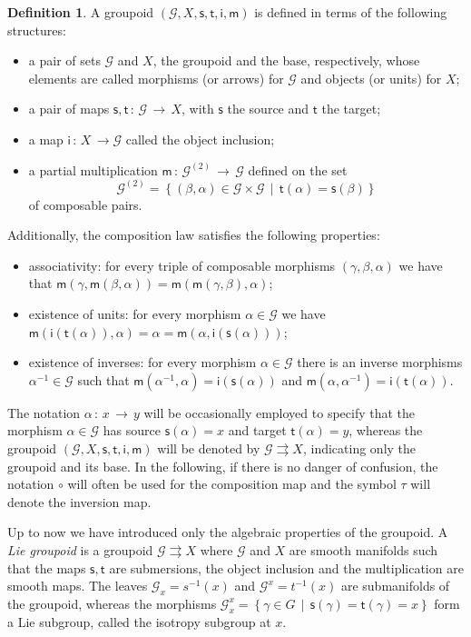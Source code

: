 \documentclass[12pt,a4paper]{article}
\numberwithin{equation}{section}
\theoremstyle{definition}
\newtheorem{definition}[equation]{Definition}
\newcommand{\cG}{\mathcal{G}}
\newcommand{\sfs}{\mathsf{s}}
\newcommand{\sft}{\mathsf{t}}
\newcommand{\sfi}{\mathsf{i}}
\newcommand{\sfm}{\mathsf{m}}
\begin{document}
\begin{definition}\label{def.grooupoid}
A groupoid $(\cG, X, \sfs, \sft, \sfi, \sfm)$ is defined in terms  of the following structures:
\begin{itemize}
\item a pair of sets $\cG$ and $X$, the groupoid and the base, respectively, whose elements are  called morphisms (or arrows) for $\cG$ and objects (or units) for $X$;
\item a pair of maps $\sfs,\sft\,\colon\,\cG\,\rightarrow\,X$, with $\sfs$ the source and $\sft$ the target;
\item a map $\sfi\,\colon\,X\,\rightarrow \cG$ called the object inclusion;
\item a partial multiplication $\sfm\,\colon\, \cG^{(2)}\,\rightarrow \,\cG$ defined on the set 
$$
\cG^{(2)}=\left\lbrace (\beta,\alpha)\in \cG\times \cG\,\mid\, \sft(\alpha)=\sfs(\beta) \right\rbrace
$$
of composable pairs.  
\end{itemize} 
Additionally, the composition law satisfies the following properties:
\begin{itemize}
\item associativity: for every triple of composable morphisms $(\gamma, \beta, \alpha)$ we have that $\sfm(\gamma,\sfm(\beta,\alpha)) = \sfm(\sfm(\gamma , \beta), \alpha)$;
\item existence of units: for every morphism $\alpha\in \cG$ we have $\sfm(\sfi({\sft(\alpha)}), \alpha) = \alpha = \sfm(\alpha, \sfi({\sfs(\alpha)}))$;
\item existence of inverses: for every morphism $\alpha \in \cG$ there is an inverse morphisms $\alpha^{-1}\in \cG$ such that $\sfm(\alpha^{-1}, \alpha) = \sfi({\sfs(\alpha)})$ and $\sfm(\alpha,\alpha^{-1})=\sfi({\sft(\alpha)})$. 
\end{itemize}
\end{definition}

The notation $\alpha\,:\,x\,\rightarrow\, y$ will be occasionally employed to specify that the morphism $\alpha \in \cG$ has source $\sfs(\alpha)=x$ and target $\sft(\alpha)=y$, whereas the groupoid $(\cG, X, \sfs, \sft, \sfi, \sfm)$ will be denoted by $\cG \rightrightarrows X$, indicating only the groupoid and its base. In the following,  if there is no danger of confusion, the notation $\circ$ will often be used for the composition map and the symbol $\tau$ will denote the inversion map.

Up to now we have introduced only the algebraic properties of the groupoid. 
A \textit{Lie groupoid} is a groupoid $\cG\rightrightarrows X$ where $\cG$ and $X$ are smooth manifolds such that the maps $\sfs,\sft$ are submersions, the object inclusion and the multiplication are smooth maps. The leaves $\cG_x = s^{-1}(x)$ and $\cG^x = t^{-1}(x)$ are submanifolds of the groupoid, whereas the morphisms $\cG_x^x = \left\lbrace \gamma \in G \,\mid\, \sfs(\gamma)=\sft(\gamma)=x \right\rbrace$ form a Lie subgroup, called the isotropy subgroup at $x$.
\end{document}
